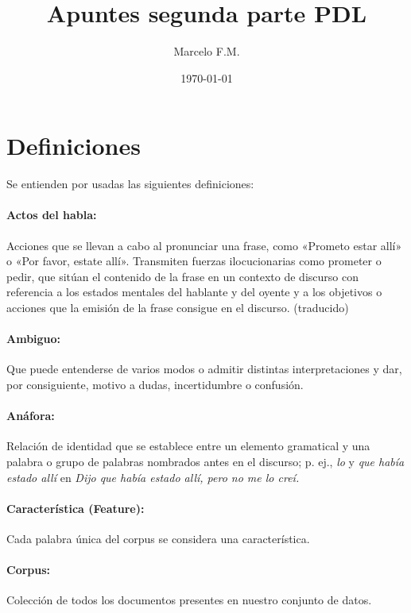 \documentclass{report}
\title{Apuntes segunda parte PDL}
\author{Marcelo F.M.}
\date{\today}
\def\profundidadIndice{section}
\begin{document}
\maketitle

\dominitoc

\etocsetnexttocdepth{\profundidadIndice}
\etoctableofcontents

\clearpage

\section{Definiciones}
Se entienden por usadas las siguientes definiciones:

\paragraph{Actos del habla:} Acciones que se llevan a cabo al pronunciar una frase, como «Prometo estar allí» o «Por favor, estate allí». Transmiten fuerzas ilocucionarias como prometer o pedir, que sitúan el contenido de la frase en un contexto de discurso con referencia a los estados mentales del hablante y del oyente y a los objetivos o acciones que la emisión de la frase consigue en el discurso. (traducido)\autocite{Daniel.AOS}

\paragraph{Ambiguo:} Que puede entenderse de varios modos o admitir distintas interpretaciones y dar, por consiguiente, motivo a dudas, incertidumbre o confusión. \autocite{rae.diccionario}

\paragraph{Anáfora:} Relación de identidad que se establece entre un elemento gramatical y una palabra o grupo de palabras nombrados antes en el discurso; p. ej.,  \textit{lo} y \textit{que había estado allí} en \textit{Dijo que había estado allí, pero no me lo creí.} \autocite{rae.diccionario}

\paragraph{Característica (Feature): } Cada palabra única del corpus se considera una característica.\autocite{diapos1}

\paragraph{Corpus:} Colección de todos los documentos presentes en nuestro conjunto de datos.\autocite{diapos1}
\end{document}
